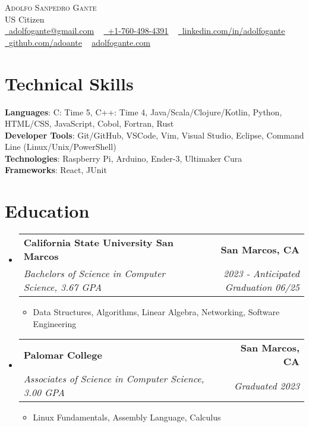 \documentclass[letterpaper,11pt]{article}
\makeatletter
\newcommand{\resumeItem}[1]{
  \item\small{
    {#1 \vspace{-3pt}}
  }
}
\newcommand{\resumeSubheading}[4]{
  \vspace{-3pt}\item
    \begin{tabular*}{1.0\textwidth}[t]{l@{\extracolsep{\fill}}r}
      \textbf{#1} & \textbf{\small #2} \\
      \textit{\small#3} & \textit{\small #4} \\
    \end{tabular*}\vspace{-7pt}
}
\newcommand{\resumeSubHeadingListStart}{\begin{itemize}[leftmargin=0.0in, label={}]}
\newcommand{\resumeSubHeadingListEnd}{\end{itemize}}
\newcommand{\resumeItemListStart}{\begin{itemize}}
\newcommand{\resumeItemListEnd}{\end{itemize}\vspace{0pt}}
\makeatother
\begin{document}
    \begin{center}
        {\Huge\scshape Adolfo Sanpedro Gante} 
        \\ US Citizen \\
        \small
        \href{mailto:EMAIL}{\raisebox{-0.2\height}\faEnvelope\  \underline{adolfogante@gmail.com}} ~
        \href{tel:+17604984391}{\raisebox{-0.2\height}\faMobile\  \underline{+1-760-498-4391}} ~ 
        \href{LINK}{\raisebox{-0.2\height}\faLinkedin\ \underline{linkedin.com/in/adolfogante}}  ~
        \href{LINK}{\raisebox{-0.2\height}\faGithub\ \underline{github.com/adoante}} ~
        \href{LINK}{\underline{adolfogante.com}}
    \end{center}

\section{Technical Skills}

\begin{itemize}
  [leftmargin=0.15in, label={}]\small{\item{
      \textbf{Languages}{: C: Time 5, C++: Time 4, Java/Scala/Clojure/Kotlin, Python, HTML/CSS, JavaScript, Cobol, Fortran, Rust} \\
      \textbf{Developer Tools}{: Git/GitHub, VSCode, Vim, Visual Studio, Eclipse, Command Line (Linux/Unix/PowerShell)} \\
      \textbf{Technologies}{: Raspberry Pi, Arduino, Ender-3,  Ultimaker Cura} \\
      \textbf{Frameworks}{: React, JUnit} \\
      }}
  \end{itemize}
    
\section{Education}
  \resumeSubHeadingListStart
  
    \resumeSubheading
    {California State University San Marcos}{San Marcos, CA}
    {Bachelors of Science in Computer Science, 3.67 GPA}{2023 - Anticipated Graduation 06/25}
      \resumeItemListStart
        \resumeItem{Data Structures, Algorithms, Linear Algebra, Networking, Software Engineering}
      \resumeItemListEnd
    \resumeSubheading
    {Palomar College}{San Marcos, CA}
    {Associates of Science in Computer Science, 3.00 GPA}{Graduated 2023}
      \resumeItemListStart
        \resumeItem{Linux Fundamentals, Assembly Language, Calculus}
      \resumeItemListEnd
  \resumeSubHeadingListEnd
\end{document}
